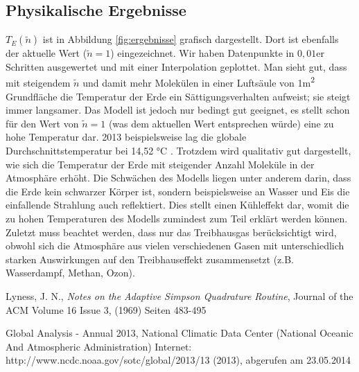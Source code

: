 \documentclass[10pt,a4paper]{article}
\begin{document}
\subsection{Physikalische Ergebnisse}
\label{ssec:physikalischeergebnisse}

$T_E(\tilde{n})$ ist in Abbildung \ref{fig:ergebnisse} grafisch dargestellt. Dort ist ebenfalls der aktuelle Wert ($\tilde{n}=1$) eingezeichnet. Wir haben Datenpunkte in $0,01$er Schritten ausgewertet und mit einer Interpolation geplottet. Man sieht gut, dass mit steigendem $\tilde{n}$ und damit mehr  Molekülen in einer Luftsäule von 1\si{\meter^2} Grundfläche die Temperatur der Erde ein Sättigungsverhalten aufweist; sie steigt immer langsamer. Das Modell ist jedoch nur bedingt gut geeignet, es stellt schon für den Wert von $\tilde{n}=1$ (was dem aktuellen Wert entsprechen würde) eine zu hohe Temperatur dar. 2013 beispielsweise lag die globale Durchschnittstemperatur bei 14,52 \si{\celsius} \cite{noaa}. Trotzdem wird qualitativ gut dargestellt, wie sich die Temperatur der Erde mit steigender Anzahl  Moleküle in der Atmosphäre erhöht.
Die Schwächen des Modells liegen unter anderem darin, dass die Erde kein schwarzer Körper ist, sondern beispielsweise an Wasser und Eis die einfallende Strahlung auch reflektiert. Dies stellt einen Kühleffekt dar, womit die zu hohen Temperaturen des Modells zumindest zum Teil erklärt werden können. Zuletzt muss beachtet werden, dass nur das Treibhausgas  berücksichtigt wird, obwohl sich die Atmosphäre aus vielen verschiedenen Gasen mit unterschiedlich starken Auswirkungen auf den Treibhauseffekt zusammensetzt (z.B. Wasserdampf, Methan, Ozon).

\begin{thebibliography}{9}

 Lyness, J. N.,
 \emph{Notes on the Adaptive Simpson Quadrature Routine},
Journal of the ACM
Volume 16 Issue 3, (1969) 
Seiten 483-495 

Global Analysis - Annual 2013, National Climatic Data Center (National Oceanic And Atmospheric Administration) Internet: http://www.ncdc.noaa.gov/sotc/global/2013/13 (2013), abgerufen am 23.05.2014

\end{thebibliography}
\end{document}
